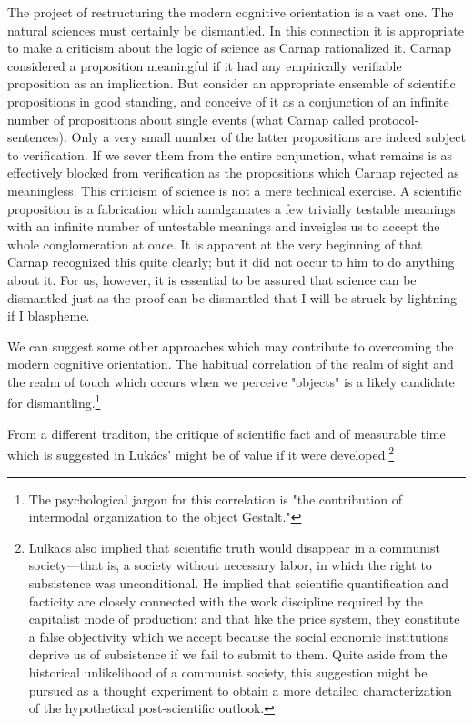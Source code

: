 \documentclass[10pt,twoside]{memoir}
\begin{document}
The project of restructuring the modern cognitive orientation is a vast 
one. The natural sciences must certainly be dismantled. In this connection it 
is appropriate to make a criticism about the logic of science as Carnap 
rationalized it. Carnap considered a proposition meaningful if it had any 
empirically verifiable proposition as an implication. But consider an 
appropriate ensemble of scientific propositions in good standing, and 
conceive of it as a conjunction of an infinite number of propositions about 
single events (what Carnap called protocol-sentences). Only a very small 
number of the latter propositions are indeed subject to verification. If we 
sever them from the entire conjunction, what remains is as effectively 
blocked from verification as the propositions which Carnap rejected as 
meaningless. This criticism of science is not a mere technical exercise. A 
scientific proposition is a fabrication which amalgamates a few trivially 
testable meanings with an infinite number of untestable meanings and 
inveigles us to accept the whole conglomeration at once. It is apparent at the 
very beginning of  that Carnap recognized this 
quite clearly; but it did not occur to him to do anything about it. For us, 
however, it is essential to be assured that science can be dismantled just as 
the proof can be dismantled that I will be struck by lightning if I blaspheme. 

We can suggest some other approaches which may contribute to 
overcoming the modern cognitive orientation. The habitual correlation of 
the realm of sight and the realm of touch which occurs when we perceive 
"objects" is a likely candidate for dismantling.\footnote{The psychological jargon for 
this correlation is "the contribution of intermodal organization to the 
object Gestalt."}

From a different traditon, the critique of scientific fact and of 
measurable time which is suggested in Luk\'{a}cs'  might be of value if it were developed.\footnote{Lulkacs also implied that scientific truth would disappear in a communist 
society---that is, a society without necessary labor, in which the right to 
subsistence was unconditional. He implied that scientific quantification and 
facticity are closely connected with the work discipline required by the 
capitalist mode of production; and that like the price system, they constitute 
a false objectivity which we accept because the social economic institutions 
deprive us of subsistence if we fail to submit to them. Quite aside from the 
historical unlikelihood of a communist society, this suggestion might be 
pursued as a thought experiment to obtain a more detailed characterization 
of the hypothetical post-scientific outlook.}
\end{document}
